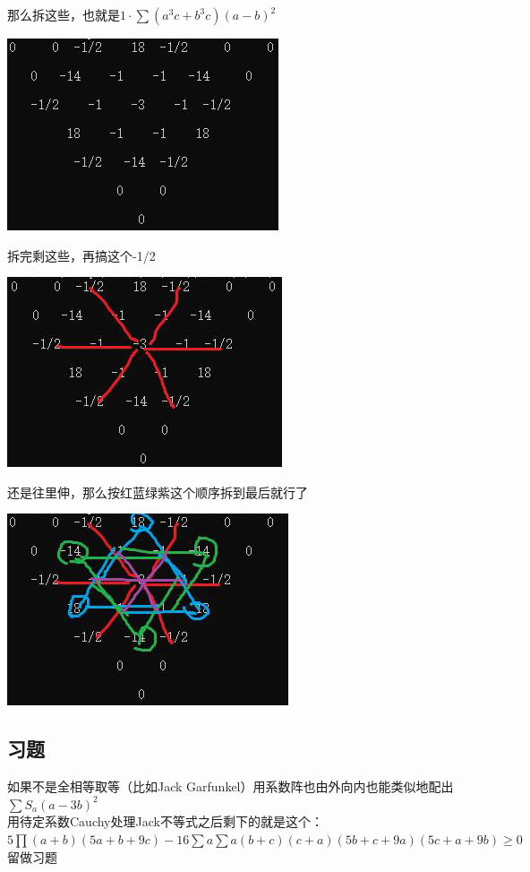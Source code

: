 \documentclass[UTF8]{ctexart}
\begin{document}
那么拆这些，也就是$ 1·\displaystyle \sum (a^3c+b^3c)(a-b)^2 $
\begin{center}
	\includegraphics[width=0.5\linewidth]{42}
\end{center}
拆完剩这些，再搞这个-1/2
\begin{center}
	\includegraphics[width=0.5\linewidth]{43}
\end{center}
还是往里伸，那么按红蓝绿紫这个顺序拆到最后就行了
\begin{center}
	\includegraphics[width=0.5\linewidth]{44}
\end{center}
\subsection{习题}
如果不是全相等取等（比如Jack Garfunkel）用系数阵也由外向内也能类似地配出$ \displaystyle \sum S_a (a-3b)^{2} $\\
用待定系数Cauchy处理Jack不等式之后剩下的就是这个：
$ 5\prod (a+b)(5a+b+9c)-16\displaystyle \sum a\displaystyle \sum a(b+c)(c+a)(5b+c+9a)(5c+a+9b)\geq 0 $留做习题
\end{document}
